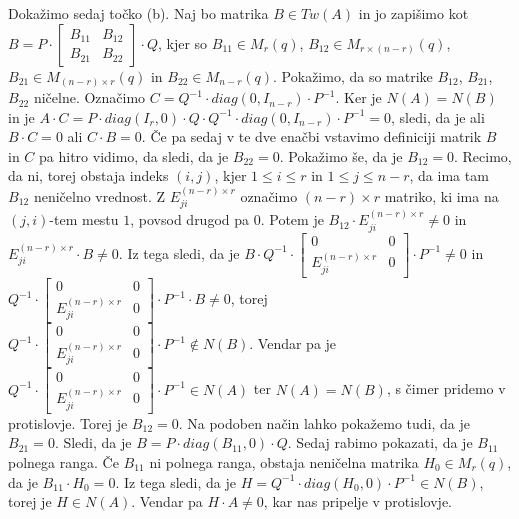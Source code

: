 \documentclass[mat1, tisk]{fmfdelo}
\begin{document}
\begin{dokaz}
  Dokažimo sedaj točko (b). Naj bo matrika $B \in Tw(A)$ in jo zapišimo kot 
  $B = P \cdot 
  \begin{bmatrix}
    B_{11} & B_{12} \\
    B_{21} & B_{22}
  \end{bmatrix}
  \cdot Q$, kjer so $B_{11} \in M_{r}(q)$, $B_{12} \in M_{r \times (n-r)}(q)$, $B_{21} \in M_{(n-r) \times r}(q)$ 
  in $B_{22} \in M_{n-r}(q)$. Pokažimo, da so matrike $B_{12}$, $B_{21}$, $B_{22}$ ničelne. 
  Označimo $C = Q^{-1} \cdot diag(0, I_{n-r}) \cdot P^{-1}$. Ker je $N(A) = N(B)$ 
  in je $A \cdot C = P \cdot diag(I_r, 0) \cdot Q \cdot Q^{-1} \cdot diag(0, I_{n-r}) \cdot P^{-1} = 0$, 
  sledi, da je ali $B \cdot C = 0$ ali $C \cdot B = 0$. Če pa sedaj v te dve enačbi vstavimo definiciji 
  matrik $B$ in $C$ pa hitro vidimo, da sledi, da je $B_{22} = 0$. Pokažimo še, da je $B_{12} = 0$. 
  Recimo, da ni, torej obstaja indeks $(i,j)$, kjer $1 \leq i \leq r$ in $1 \leq j \leq n-r$, da 
  ima tam $B_{12}$ neničelno vrednost. Z $E_{ji}^{(n-r) \times r}$ označimo $(n-r) \times r$ matriko, 
  ki ima na $(j,i)$-tem mestu $1$, povsod drugod pa $0$. Potem je $B_{12} \cdot E_{ji}^{(n-r) \times r} \neq 0$ 
  in $E_{ji}^{(n-r) \times r} \cdot B \neq 0$. Iz tega sledi, da je 
  $B \cdot Q^{-1} \cdot 
  \begin{bmatrix}
    0 & 0 \\
    E_{ji}^{(n-r) \times r} & 0
  \end{bmatrix}
  \cdot P^{-1} \neq 0$ in 
  $Q^{-1} \cdot 
  \begin{bmatrix}
    0 & 0 \\
    E_{ji}^{(n-r) \times r} & 0
  \end{bmatrix}
  \cdot P^{-1} \cdot B \neq 0$, torej 
  $Q^{-1} \cdot 
  \begin{bmatrix}
    0 & 0 \\
    E_{ji}^{(n-r) \times r} & 0
  \end{bmatrix}
  \cdot P^{-1} \notin N(B)$. Vendar pa je 
  $Q^{-1} \cdot 
  \begin{bmatrix}
    0 & 0 \\
    E_{ji}^{(n-r) \times r} & 0
  \end{bmatrix}
  \cdot P^{-1} \in N(A)$ ter $N(A) = N(B)$, s čimer pridemo v protislovje. 
  Torej je $B_{12} = 0$. Na podoben način lahko pokažemo tudi, da je $B_{21} = 0$. 
  Sledi, da je $B = P \cdot diag(B_{11}, 0) \cdot Q$. Sedaj rabimo pokazati, da je 
  $B_{11}$ polnega ranga. Če $B_{11}$ ni polnega ranga, obstaja neničelna matrika 
  $H_0 \in M_r (q)$, da je $B_{11} \cdot H_0 = 0$. Iz tega sledi, da je 
  $H = Q^{-1} \cdot diag(H_0, 0) \cdot P^{-1} \in N(B)$, torej je $H \in N(A)$. 
  Vendar pa $H \cdot A \neq 0$, kar nas pripelje v protislovje.


\end{dokaz}
\end{document}
